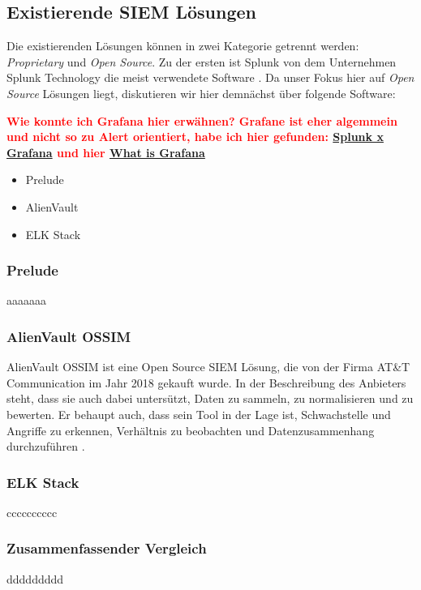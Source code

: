\subsection{Existierende SIEM Lösungen}

Die existierenden  Lösungen können in zwei Kategorie getrennt werden: \textit{\gls{Proprietary}} und \textit{\gls{Open Source}}. Zu der ersten ist Splunk von dem Unternehmen Splunk Technology die meist verwendete Software \citep{Kazarov_Splunk}. Da unser Fokus hier auf \textit{\gls{Open Source}} Lösungen liegt, diskutieren wir hier demnächst über folgende Software:

\textbf{\textcolor{red}{Wie konnte ich Grafana hier erwähnen? Grafane ist eher algemmein und nicht so zu Alert orientiert, habe ich hier gefunden: \href{https://www.metricfire.com/blog/grafana-vs-splunk/}{Splunk x Grafana} und hier \href{https://www.researchgate.net/publication/350730340_Implementation_of_Grafana_as_open_source_visualization_and_query_processing_platform_for_data_scientists_and_researchers}{What is Grafana}}  }

\begin{itemize}[noitemsep]
   \item Prelude
   \item AlienVault
   \item ELK Stack
\end{itemize}

\subsubsection{Prelude}
aaaaaaa

\subsubsection{AlienVault OSSIM}
AlienVault OSSIM ist eine \gls{Open Source} SIEM Lösung, die von der Firma AT\&T Communication im Jahr 2018 gekauft wurde. In der Beschreibung des Anbieters steht, dass sie auch dabei untersützt, Daten zu sammeln, zu normalisieren und zu bewerten. Er behaupt auch, dass sein Tool in der Lage ist, Schwachstelle und Angriffe zu erkennen, Verhältnis zu beobachten und Datenzusammenhang durchzuführen \citep{ATT_AVO}.

\subsubsection{ELK Stack}
cccccccccc

\subsubsection{Zusammenfassender Vergleich}
ddddddddd

